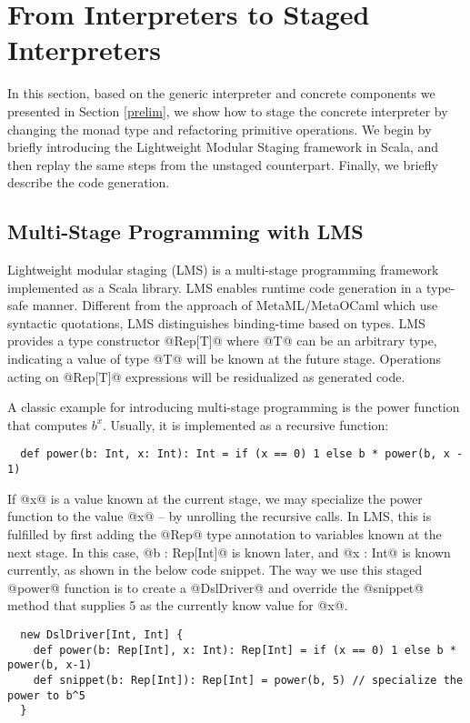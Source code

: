 \section{From Interpreters to Staged Interpreters} \label{stagedinterp}

In this section, based on the generic interpreter and concrete components we
presented in Section \ref{prelim}, we show how to stage the concrete
interpreter by changing the monad type and refactoring primitive
operations. We begin by briefly introducing the Lightweight Modular Staging
framework in Scala, and then replay the same steps from the unstaged
counterpart. Finally, we briefly describe the code generation.

\subsection{Multi-Stage Programming with LMS}

Lightweight modular staging (LMS) \cite{DBLP:conf/gpce/RompfO10} is a
multi-stage programming framework implemented as a Scala library. LMS enables
runtime code generation in a type-safe manner. Different from the approach of
MetaML/MetaOCaml \cite{DBLP:conf/flops/Kiselyov14, DBLP:conf/gpce/CalcagnoTHL03} which
use syntactic quotations, LMS distinguishes binding-time based on types. 
LMS provides a type constructor @Rep[T]@ where @T@ can be
an arbitrary type, indicating a value of type @T@ will be known at the future stage.
Operations acting on @Rep[T]@ expressions will be residualized as generated
code.

A classic example for introducing multi-stage programming is the power function
that computes $b^x$. Usually, it is implemented as a recursive function:
\begin{lstlisting}
  def power(b: Int, x: Int): Int = if (x == 0) 1 else b * power(b, x - 1)
\end{lstlisting}

If @x@ is a value known at the current stage, we may specialize the power function to
the value @x@ -- by unrolling the recursive calls. In LMS, this is fulfilled by
first adding the @Rep@ type annotation to variables known at the next stage. In this case,
@b : Rep[Int]@ is known later, and @x : Int@ is known currently, as shown in the
below code snippet.
The way we use this staged @power@ function is to create a @DslDriver@ and override the
@snippet@ method that supplies 5 as the currently know value for @x@.
\begin{lstlisting}
  new DslDriver[Int, Int] {
    def power(b: Rep[Int], x: Int): Rep[Int] = if (x == 0) 1 else b * power(b, x-1)
    def snippet(b: Rep[Int]): Rep[Int] = power(b, 5) // specialize the power to b^5
  }
\end{lstlisting}

